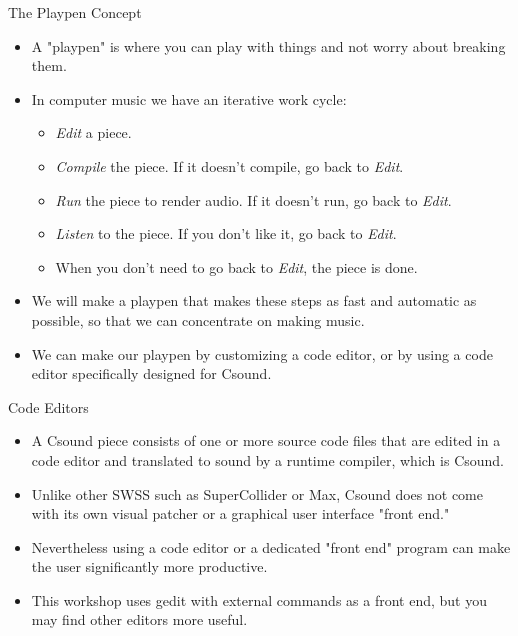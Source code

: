 \documentclass{beamer}
\begin{document}
    \begin{frame}{The Playpen Concept}
        \begin{itemize}
            \item A "playpen" is where you can play with things and not worry 
            about breaking them.
            \item In computer music we have an iterative work cycle:
            	\begin{itemize}
		   \item \textit{Edit} a piece.
		   \item \textit{Compile} the piece. If it doesn't compile, go back to \textit{Edit}.
		   \item \textit{Run} the piece to render audio. If it doesn't run, go back to \emph{Edit}.
		   \item \textit{Listen} to the piece. If you don't like it, go back to \emph{Edit}.
		   \item When you don't need to go back to \emph{Edit}, the piece is done.
	        \end{itemize}
            \item  We will make a playpen that makes these steps as fast and 
            automatic as possible, so that we can concentrate on making music.
            \item We can make our playpen by customizing a code editor, or by 
            using a code editor specifically designed for Csound.
          \end{itemize}    
    \end{frame}
    
    \begin{frame}{Code Editors}
        \begin{itemize}
            \item A Csound piece consists of one or more source code files that are
            edited in a code editor and translated to sound by a runtime compiler, which is
            Csound.
            \item Unlike other SWSS such as SuperCollider or Max, Csound does not
            come with its own visual patcher or a graphical user interface "front end."
            \item Nevertheless using a code editor or a dedicated "front end"
            program can make the user significantly more productive.
            \item This workshop uses gedit with external commands as a front end, but you 
            may find other editors more useful.
        \end{itemize}
    \end{frame}
    
\end{document}

